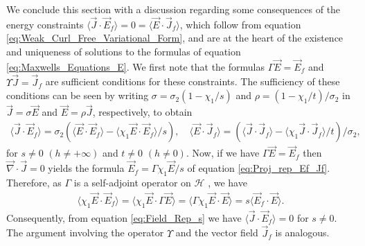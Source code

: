 \documentclass{cmslatex}
\begin{document}
We conclude this section with a discussion regarding some 
consequences of the energy constraints
$\langle\vec{J}\cdot\vec{E}_f\rangle=0=\langle\vec{E}\cdot\vec{J}_f\rangle$, which follow from
equation \eqref{eq:Weak_Curl_Free_Variational_Form}, and are at the
heart of the existence and uniqueness of solutions to the formulas of equation
\eqref{eq:Maxwells_Equations_E}. We first note that the formulas
$\Gamma\vec{E}=\vec{E}_f$ and $\Upsilon\vec{J}=\vec{J}_f$ are sufficient
conditions for these constraints. The sufficiency of these conditions
can be seen by writing $\sigma=\sigma_2(1-\chi_1/s)$ and $\rho=(1-\chi_1/t)/\sigma_2$ in
$\vec{J}=\sigma\vec{E}$ and $\vec{E}=\rho\vec{J}$, respectively, to obtain           
% 
\begin{align}\label{eq:Field_Rep_s}
  \langle\vec{J}\cdot\vec{E}_f\rangle=\sigma_2(\langle\vec{E}\cdot\vec{E}_f\rangle-\langle\chi_1\vec{E}\cdot\vec{E}_f\rangle/s),
 \quad
  \langle\vec{E}\cdot\vec{J}_f\rangle=(\langle\vec{J}\cdot\vec{J}_f\rangle-\langle\chi_1\vec{J}\cdot\vec{J}_f\rangle/t)/\sigma_2, 
\end{align}
%
for $s\neq0$ $(h\neq+\infty)$ and $t\neq0$ $(h\neq0)$. Now, if we have $\Gamma\vec{E}=\vec{E}_f$ then 
$\vec{\nabla}\cdot\vec{J}=0$ yields the formula $\vec{E}_f=\Gamma\chi_1\vec{E}/s$ of equation
\eqref{eq:Proj_rep_Ef_Jf}. Therefore, as $\Gamma$ is a self-adjoint 
operator on $\mathscr{H}$ \cite{Stakgold:BVP:2000,Stone:64,Folland:95}, we have     
%
\begin{align}\label{eq:Suff_Cond}
  \langle\chi_1\vec{E}\cdot\vec{E}_f\rangle=\langle\chi_1\vec{E}\cdot\Gamma\vec{E}\rangle
                    =\langle\Gamma\chi_1\vec{E}\cdot\vec{E}\rangle
                    =s\langle\vec{E}_f\cdot\vec{E}\rangle.
\end{align}
%
Consequently, from equation \eqref{eq:Field_Rep_s}
we have $\langle\vec{J}\cdot\vec{E}_f\rangle=0$ for $s\neq0$. The argument involving the
operator $\Upsilon$ and the vector field $\vec{J}_f$ is analogous.
\end{document}
